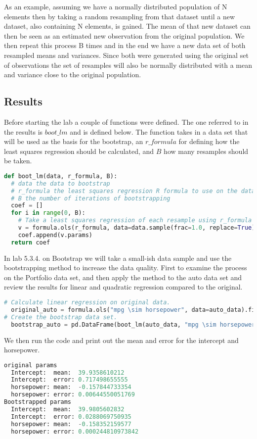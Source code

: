 As an example, assuming we have a normally distributed population of N elements then by taking a random resampling from that dataset until a new dataset, also containing N elements, is gained. The mean of that new dataset can then be seen as an estimated new observation from the original population. We then repeat this process B times and in the end we have a new data set of both resampled means and variances. Since both were generated using the original set of observations the set of resamples will also be normally distributed with a mean and variance close to the original population. 
\fi

\subsection{Results}

Before starting the lab a couple of functions were defined. The one referred to in the results is $boot\_lm$ and is defined below. The function takes in a data set that will be used as the basis for the bootstrap, an $r\_formula$ for defining how the least squares regression should be calculated, and $B$ how many resamples should be taken.

\begin{lstlisting}[language=Python]
def boot_lm(data, r_formula, B):
  # data the data to bootstrap
  # r_formula the least squares regression R formula to use on the data
  # B the number of iterations of bootstrapping
  coef = []
  for i in range(0, B):
    # Take a least squares regression of each resample using r_formula
    v = formula.ols(r_formula, data=data.sample(frac=1.0, replace=True)).fit()
    coef.append(v.params)
  return coef
\end{lstlisting}

In lab 5.3.4. on Bootstrap we will take a small-ish data sample and use the bootstrapping method to increase the data quality. First to examine the process on the Portfolio data set, and then apply the method to the auto data set and review the results for linear and quadratic regression compared to the original.

\begin{lstlisting}[language=Python]
# Calculate linear regression on original data.
  original_auto = formula.ols("mpg \sim horsepower", data=auto_data).fit() 
# Create the bootstrap data set.
  bootstrap_auto = pd.DataFrame(boot_lm(auto_data, "mpg \sim horsepower", 1000)) 
\end{lstlisting}
We then run the code and print out the mean and error for the intercept and horsepower.
\begin{lstlisting}[language=Python]
original params
  Intercept:  mean:  39.9358610212
  Intercept:  error: 0.717498655555
  horsepower: mean:  -0.157844733354
  horsepower: error: 0.00644550051769
Bootstrapped params
  Intercept:  mean:  39.9805602832
  Intercept:  error: 0.0288069750935
  horsepower: mean:  -0.158352159577
  horsepower: error: 0.000244810973842
\end{lstlisting}


